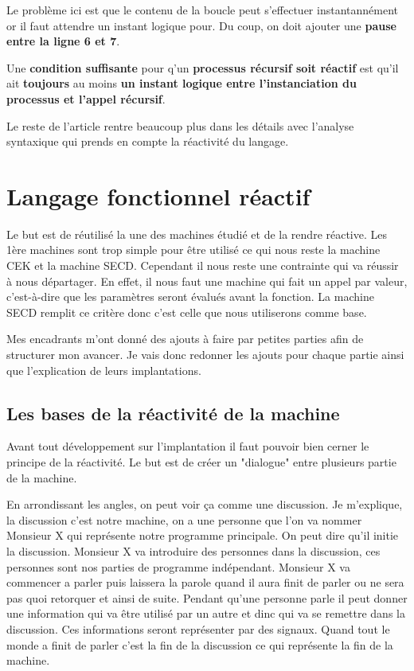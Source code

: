 \documentclass[10pt,a4paper]{article}
\begin{document}
				Le probl\`{e}me ici est que le contenu de la boucle peut s'effectuer instantann\'{e}ment or il faut attendre un instant logique pour. Du coup, on doit ajouter une \textbf{pause entre la ligne 6 et 7}.
				\bigbreak
				
				Une \textbf{condition suffisante} pour q'un \textbf{processus r\'{e}cursif soit r\'{e}actif} est qu'il ait \textbf{toujours} au moins \textbf{un instant logique entre l'instanciation du processus et l'appel r\'{e}cursif}.
				\bigbreak
				
				Le reste de l'article rentre beaucoup plus dans les détails avec l'analyse syntaxique qui prends en compte la réactivité du langage.
		
			\newpage
			
			
			
		\section{Langage fonctionnel réactif}\label{SECDConc4}
			
			Le but est de réutilisé la une des machines étudié et de la rendre réactive. Les 1ère machines sont trop simple pour être utilisé ce qui nous reste la machine CEK et la machine SECD. Cependant il nous reste une contrainte qui va réussir à nous départager. En effet, il nous faut une machine qui fait un appel par valeur, c'est-à-dire que les paramètres seront évalués avant la fonction. La machine SECD remplit ce critère donc c'est celle que nous utiliserons comme base.
			\medbreak
			
			Mes encadrants m'ont donné des ajouts à faire par petites parties afin de structurer mon avancer. Je vais donc redonner les ajouts pour chaque partie ainsi que l'explication de leurs implantations.
			\bigbreak
			
			
			\subsection{Les bases de la réactivité de la machine}
				
				Avant tout développement sur l'implantation il faut pouvoir bien cerner le principe de la réactivité. Le but est de créer un "dialogue" entre plusieurs partie de la machine. 
				\medbreak
				
				En arrondissant les angles, on peut voir ça comme une discussion. Je m'explique, la discussion c'est notre machine, on a une personne que l'on va nommer Monsieur X qui représente notre programme principale. On peut dire qu'il initie la discussion. Monsieur X va introduire des personnes dans la discussion, ces personnes sont nos parties de programme indépendant. Monsieur X va commencer a parler puis laissera la parole quand il aura finit de parler ou ne sera pas quoi retorquer et ainsi de suite. Pendant qu'une personne parle il peut donner une information qui va être utilisé par un autre et dinc qui va se remettre dans la discussion. Ces informations seront représenter par des signaux. Quand tout le monde a finit de parler c'est la fin de la discussion ce qui représente la fin de la machine.
				\medbreak
				
\end{document}
